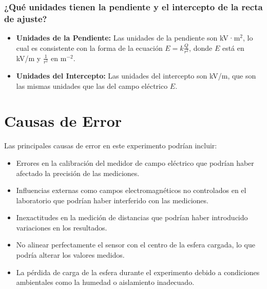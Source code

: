 \subsubsection{¿Qué unidades tienen la pendiente y el intercepto de la recta de ajuste?}
\begin{itemize}
    \item \textbf{Unidades de la Pendiente:} Las unidades de la pendiente son kV·m\(^2\), lo cual es consistente con la forma de la ecuación \( E = k \frac{Q}{r^2} \), donde \( E \) está en kV/m y \( \frac{1}{r^2} \) en m\(^{-2}\).
    \item \textbf{Unidades del Intercepto:} Las unidades del intercepto son kV/m, que son las mismas unidades que las del campo eléctrico \( E \).
\end{itemize}

\section{Causas de Error}
Las principales causas de error en este experimento podrían incluir:
\begin{itemize}
    \item Errores en la calibración del medidor de campo eléctrico que podrían haber afectado la precisión de las mediciones.
    \item Influencias externas como campos electromagnéticos no controlados en el laboratorio que podrían haber interferido con las mediciones.
    \item Inexactitudes en la medición de distancias que podrían haber introducido variaciones en los resultados.
    \item No alinear perfectamente el sensor con el centro de la esfera cargada, lo que podría alterar los valores medidos.
    \item La pérdida de carga de la esfera durante el experimento debido a condiciones ambientales como la humedad o aislamiento inadecuado.
\end{itemize}

